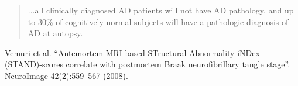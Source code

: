 
\begin{frame}
\begin{quote}
...all clinically diagnosed AD patients will not have AD pathology, and up to 30\% of cognitively normal subjects will have a pathologic diagnosis of AD at autopsy.
\end{quote}

\begin{center}\begin{tiny}
Vemuri et al. ``Antemortem MRI based STructural Abnormality iNDex (STAND)-scores correlate with postmortem Braak neurofibrillary tangle stage''. NeuroImage 42(2):559--567 (2008).

\end{tiny}\end{center}
\end{frame}

